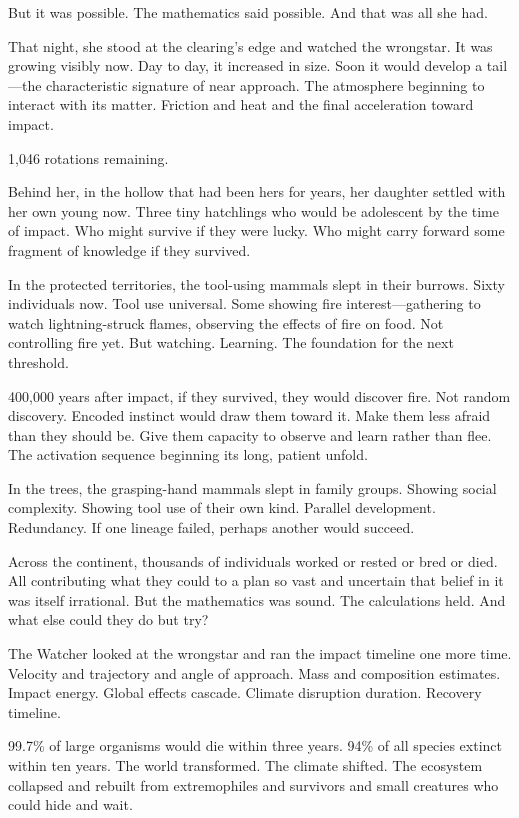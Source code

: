 But it was possible. The mathematics said possible. And that was all she had.

\scenebreak

That night, she stood at the clearing's edge and watched the wrongstar. It was growing visibly now. Day to day, it increased in size. Soon it would develop a tail—the characteristic signature of near approach. The atmosphere beginning to interact with its matter. Friction and heat and the final acceleration toward impact.

1,046 rotations remaining.

Behind her, in the hollow that had been hers for years, her daughter settled with her own young now. Three tiny hatchlings who would be adolescent by the time of impact. Who might survive if they were lucky. Who might carry forward some fragment of knowledge if they survived.

In the protected territories, the tool-using mammals slept in their burrows. Sixty individuals now. Tool use universal. Some showing fire interest—gathering to watch lightning-struck flames, observing the effects of fire on food. Not controlling fire yet. But watching. Learning. The foundation for the next threshold.

400,000 years after impact, if they survived, they would discover fire. Not random discovery. Encoded instinct would draw them toward it. Make them less afraid than they should be. Give them capacity to observe and learn rather than flee. The activation sequence beginning its long, patient unfold.

In the trees, the grasping-hand mammals slept in family groups. Showing social complexity. Showing tool use of their own kind. Parallel development. Redundancy. If one lineage failed, perhaps another would succeed.

Across the continent, thousands of individuals worked or rested or bred or died. All contributing what they could to a plan so vast and uncertain that belief in it was itself irrational. But the mathematics was sound. The calculations held. And what else could they do but try?

The Watcher looked at the wrongstar and ran the impact timeline one more time. Velocity and trajectory and angle of approach. Mass and composition estimates. Impact energy. Global effects cascade. Climate disruption duration. Recovery timeline.

99.7\% of large organisms would die within three years. 94\% of all species extinct within ten years. The world transformed. The climate shifted. The ecosystem collapsed and rebuilt from extremophiles and survivors and small creatures who could hide and wait.

